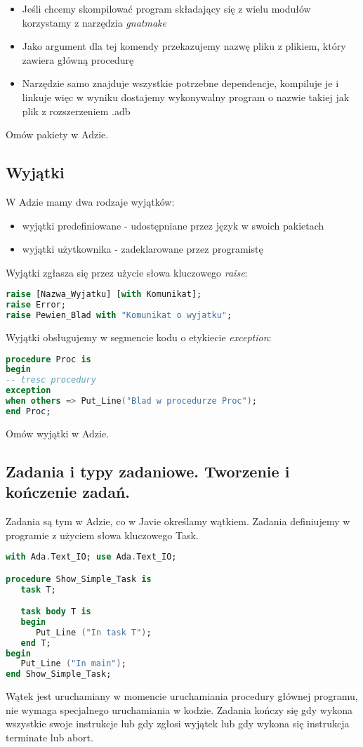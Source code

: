 \documentclass[a4paper,15pt]{article}
\newcommand{\ask}[2]{
    \begin{tcolorbox}[colback=black!5!white,colframe=gray,title={Pytanie #1}]
        #2
    \end{tcolorbox}
}
\begin{document}
\begin{itemize}
\item Jeśli chcemy skompilować program składający się z wielu modułów korzystamy z narzędzia \textit{gnatmake}
\item Jako argument dla tej komendy przekazujemy nazwę pliku z plikiem, który zawiera główną procedurę
\item Narzędzie samo znajduje wszystkie potrzebne dependencje, kompiluje je i linkuje więc w wyniku dostajemy wykonywalny program o nazwie takiej jak plik z rozszerzeniem .adb
\end{itemize}

\ask{}{
Omów pakiety w Adzie.
}

\subsection{Wyjątki}

W Adzie mamy dwa rodzaje wyjątków:
\begin{itemize}
\item wyjątki predefiniowane - udostępniane przez język w swoich pakietach
\item wyjątki użytkownika - zadeklarowane przez programistę
\end{itemize}

Wyjątki zgłasza się przez użycie słowa kluczowego \textit{raise}:
\begin{lstlisting}[language=Ada]
raise [Nazwa_Wyjatku] [with Komunikat];
raise Error;
raise Pewien_Blad with "Komunikat o wyjatku";
\end{lstlisting}
Wyjątki obsługujemy w segmencie kodu o etykiecie \textit{exception}:
\begin{lstlisting}[language=Ada]
procedure Proc is
begin
-- tresc procedury
exception
when others => Put_Line("Blad w procedurze Proc");
end Proc;
\end{lstlisting}
\ask{}{
Omów wyjątki w Adzie.
}

\subsection{Zadania i typy zadaniowe. Tworzenie i kończenie zadań.}

Zadania są tym w Adzie, co w Javie określamy wątkiem. Zadania definiujemy w programie z użyciem słowa kluczowego Task.  
\begin{lstlisting}[language=Ada]
with Ada.Text_IO; use Ada.Text_IO;

procedure Show_Simple_Task is
   task T;

   task body T is
   begin
      Put_Line ("In task T");
   end T;
begin
   Put_Line ("In main");
end Show_Simple_Task;
\end{lstlisting}
Wątek jest uruchamiany w momencie uruchamiania procedury głównej programu, nie wymaga specjalnego uruchamiania w kodzie. Zadania kończy się gdy wykona wszystkie swoje instrukcje lub gdy zgłosi wyjątek lub gdy wykona się instrukcja terminate lub abort. \\
\end{document}
